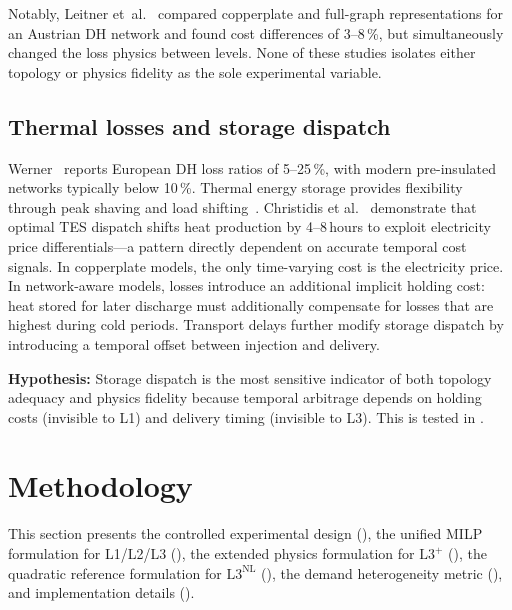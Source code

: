\documentclass[review,3p]{elsarticle}
\newcommand{\Lplus}{\mathrm{L3}^{+}}
\newcommand{\Lnl}{\mathrm{L3}^{\mathrm{NL}}}
\begin{document}
Notably, Leitner et~al.~\cite{Leitner2019} compared copperplate and
full-graph representations for an Austrian DH network and found cost
differences of 3--8\,\%, but simultaneously changed the loss physics
between levels. None of these studies isolates either topology or
physics fidelity as the sole experimental variable.

\subsection{Thermal losses and storage dispatch}
\label{sec:rw_losses_storage}

Werner~\cite{Werner2017} reports European DH loss ratios of 5--25\,\%,
with modern pre-insulated networks typically below 10\,\%. Thermal
energy storage provides flexibility through peak shaving and load
shifting~\cite{Vandermeulen2018,Guelpa2019review}. Christidis et
al.~\cite{Christidis2017} demonstrate that optimal TES dispatch shifts
heat production by 4--8\,hours to exploit electricity price
differentials---a pattern directly dependent on accurate temporal cost
signals. In copperplate models, the only time-varying cost is the
electricity price. In network-aware models, losses introduce an
additional implicit holding cost: heat stored for later discharge must
additionally compensate for losses that are highest during cold
periods. Transport delays further modify storage dispatch by
introducing a temporal offset between injection and delivery.

\textbf{Hypothesis:} Storage dispatch is the most sensitive indicator
of both topology adequacy and physics fidelity because temporal
arbitrage depends on holding costs (invisible to L1) and delivery
timing (invisible to L3). This is tested in
.

\section{Methodology}
\label{sec:methodology}

This section presents the controlled experimental design
(), the unified MILP formulation for L1/L2/L3
(), the extended physics formulation for $\Lplus$
(), the quadratic reference formulation for
$\Lnl$ (), the demand heterogeneity metric
(), and implementation details
().
\end{document}
